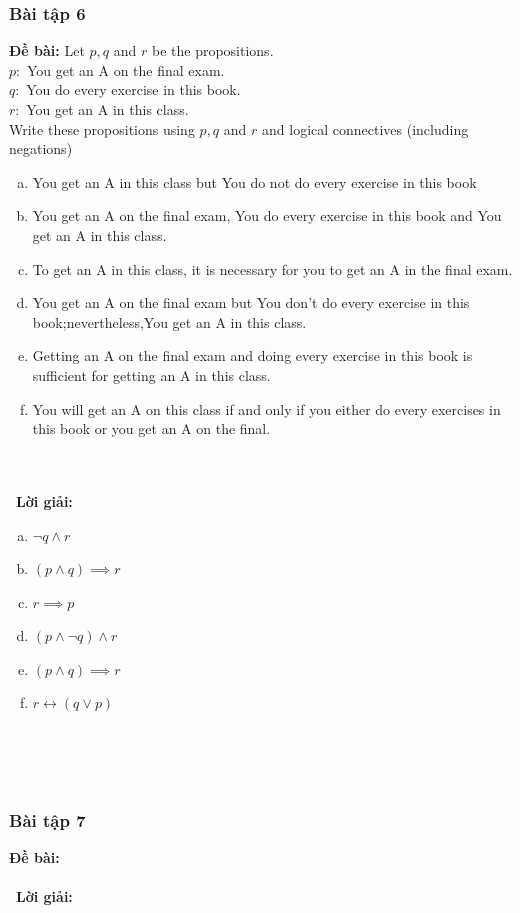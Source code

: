 \documentclass[a4paper]{article}
\begin{document}
\subsubsection{Bài tập 6}
\textbf{Đề bài:}  Let $p,q$ and $r$ be the propositions.\\
$p:$ You get an A on the final exam.\\
$q:$ You do every exercise in this book.\\
$r:$ You get an A in this class.\\
Write these propositions using $p,q$ and $r$ and logical connectives (including negations)
\begin{enumerate}[a)]
\item You get an A in this class but You do not do every exercise in this book
\item You get an A on the final exam, You do every exercise in this book and You get an A in this class.
\item To get an A in this class, it is necessary for you to get an A in the final exam. 
\item You get an A on the final exam but You don't do every exercise in this book;nevertheless,You get an A in this class.
\item Getting an A on the final exam and doing every exercise in this book is sufficient for getting an A in this class.
\item You will get an A on this class if and only if you either do every exercises in this book or you get an A on the final.
\end{enumerate}
\\\ \\\
\textbf{Lời giải:}  \begin{enumerate}[a)]
\item $\lnot q \land r$
\item $(p \land q) \implies r$
\item $r \implies p$
\item $(p \land \lnot q) \land r$ 
\item $(p \land q) \implies r$
\item $r \leftrightarrow (q \lor p)$
\end{enumerate}\\\ \\\
\clearpage
\subsubsection{Bài tập 7}
\textbf{Đề bài:} 
\\\ \\\
\textbf{Lời giải:} \\\ \\\
\clearpage
\end{document}
